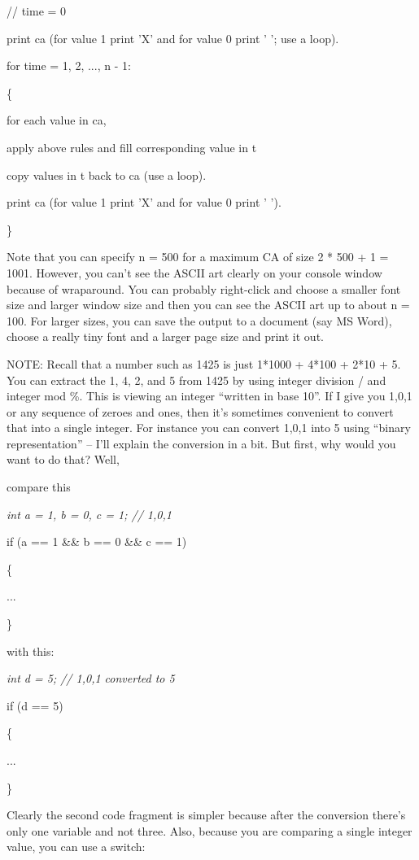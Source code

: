 \documentclass[
]{article}
\begin{document}
// time = 0

print ca (for value 1 print 'X' and for value 0 print ' '; use a loop).

for time = 1, 2, ..., n - 1:

\{

for each value in ca,

apply above rules and fill corresponding value in t

copy values in t back to ca (use a loop).

print ca (for value 1 print 'X' and for value 0 print ' ').

\}

Note that you can specify n = 500 for a maximum CA of size 2 * 500 + 1 =
1001. However, you can't see the ASCII art clearly on your console
window because of wraparound. You can probably right-click and choose a
smaller font size and larger window size and then you can see the ASCII
art up to about n = 100. For larger sizes, you can save the output to a
document (say MS Word), choose a really tiny font and a larger page size
and print it out.

NOTE: Recall that a number such as 1425 is just 1*1000 + 4*100 + 2*10 +
5. You can extract the 1, 4, 2, and 5 from 1425 by using integer
division / and integer mod \%. This is viewing an integer ``written in
base 10''. If I give you 1,0,1 or any sequence of zeroes and ones, then
it's sometimes convenient to convert that into a single integer. For
instance you can convert 1,0,1 into 5 using ``binary representation'' --
I'll explain the conversion in a bit. But first, why would you want to
do that? Well,

compare this

\emph{int a = 1, b = 0, c = 1; // 1,0,1}

if (a == 1 \&\& b == 0 \&\& c == 1)

\{

...

\}

with this:

\emph{int d = 5; // 1,0,1 converted to 5}

if (d == 5)

\{

...

\}

Clearly the second code fragment is simpler because after the conversion
there's only one variable and not three. Also, because you are comparing
a single integer value, you can use a switch:
\end{document}
